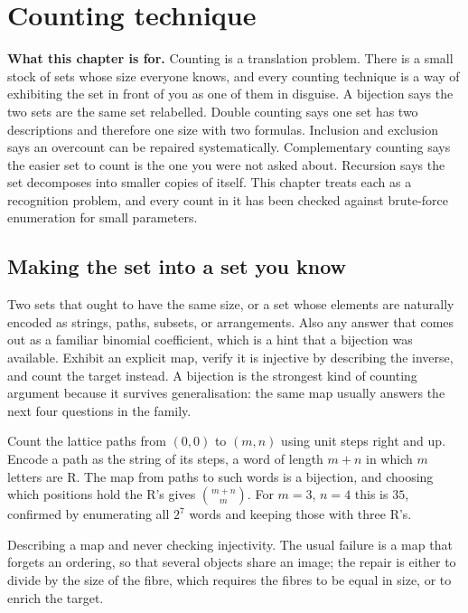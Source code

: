 \chapter{Counting technique}

\begin{orient}
\textbf{What this chapter is for.} Counting is a translation problem. There is a small stock of sets whose size everyone knows, and every counting technique is a way of exhibiting the set in front of you as one of them in disguise. A bijection says the two sets are the same set relabelled. Double counting says one set has two descriptions and therefore one size with two formulas. Inclusion and exclusion says an overcount can be repaired systematically. Complementary counting says the easier set to count is the one you were not asked about. Recursion says the set decomposes into smaller copies of itself. This chapter treats each as a recognition problem, and every count in it has been checked against brute-force enumeration for small parameters.
\end{orient}

\section{Making the set into a set you know}

\cue Two sets that ought to have the same size, or a set whose elements are naturally encoded as strings, paths, subsets, or arrangements. Also any answer that comes out as a familiar binomial coefficient, which is a hint that a bijection was available.
\method Exhibit an explicit map, verify it is injective by describing the inverse, and count the target instead. A bijection is the strongest kind of counting argument because it survives generalisation: the same map usually answers the next four questions in the family.

\begin{worked}
Count the lattice paths from $(0,0)$ to $(m,n)$ using unit steps right and up. Encode a path as the string of its steps, a word of length $m+n$ in which $m$ letters are R. The map from paths to such words is a bijection, and choosing which positions hold the R's gives $\binom{m+n}{m}$. For $m=3$, $n=4$ this is $35$, confirmed by enumerating all $2^{7}$ words and keeping those with three R's.
\end{worked}

\begin{trap}
Describing a map and never checking injectivity. The usual failure is a map that forgets an ordering, so that several objects share an image; the repair is either to divide by the size of the fibre, which requires the fibres to be equal in size, or to enrich the target.
\end{trap}

